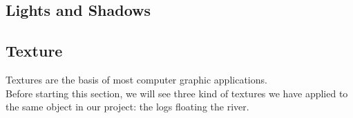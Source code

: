 \documentclass[a4paper, 11pt]{article}
\begin{document}
\subsection{Lights and Shadows}
\subsection{Texture}
Textures are the basis of most computer graphic applications.\\
Before starting this section, we will see three kind of textures we have applied to the same object in our project: the logs floating the river.\\
\end{document}
